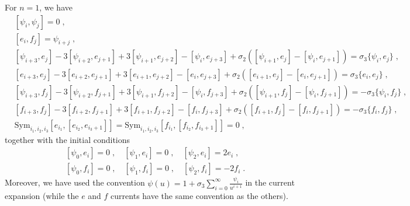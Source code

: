 \documentclass[11pt]{article}
\numberwithin{equation}{section}
\numberwithin{figure}{section}
\numberwithin{table}{section}
\begin{document}
For $n=1$, we have
\begin{subequations}
	\begin{align}
		&[\psi_i,\psi_j]=0\;,\\
		&[e_i,f_j]=\psi_{i+j}\;,\\
		&[\psi_{i+3},e_j]-3[\psi_{i+2},e_{j+1}]+3[\psi_{i+1},e_{j+2}]-[\psi_i,e_{j+3}]+\sigma_2([\psi_{i+1},e_j]-[\psi_i,e_{j+1}])=\sigma_3\{\psi_i,e_j\}\;,\\
		&[e_{i+3},e_j]-3[e_{i+2},e_{j+1}]+3[e_{i+1},e_{j+2}]-[e_i,e_{j+3}]+\sigma_2([e_{i+1},e_j]-[e_i,e_{j+1}])=\sigma_3\{e_i,e_j\}\;,\\
		&[\psi_{i+3},f_j]-3[\psi_{i+2},f_{j+1}]+3[\psi_{i+1},f_{j+2}]-[\psi_i,f_{j+3}]+\sigma_2([\psi_{i+1},f_j]-[\psi_i,f_{j+1}])=-\sigma_3\{\psi_i,f_j\}\;,\\
		&[f_{i+3},f_j]-3[f_{i+2},f_{j+1}]+3[f_{i+1},f_{j+2}]-[f_i,f_{j+3}]+\sigma_2([f_{i+1},f_j]-[f_i,f_{j+1}])=-\sigma_3\{f_i,f_j\}\;,\\
		&\mathrm{Sym}_{i_1,i_2,i_3}[e_{i_1},[e_{i_2},e_{i_3+1}]]=\mathrm{Sym}_{i_1,i_2,i_3}[f_{i_1},[f_{i_2},f_{i_3+1}]]=0\;,
	\end{align}
\end{subequations}
together with the initial conditions
\begin{subequations}
	\begin{align}
		&[\psi_0,e_i]=0\;,\quad[\psi_1,e_i]=0\;,\quad[\psi_2,e_i]=2e_i\;,\\
		&[\psi_0,f_i]=0\;,\quad[\psi_1,f_i]=0\;,\quad[\psi_2,f_i]=-2f_i\;.
	\end{align}
\end{subequations}
Moreover, we have used the convention $\psi(u)=1+\sigma_3\sum\limits_{i=0}^\infty\frac{\psi_i}{u^{i+1}}$ in the current expansion (while the $e$ and $f$ currents have the same convention as the others).



{}


\end{document}
